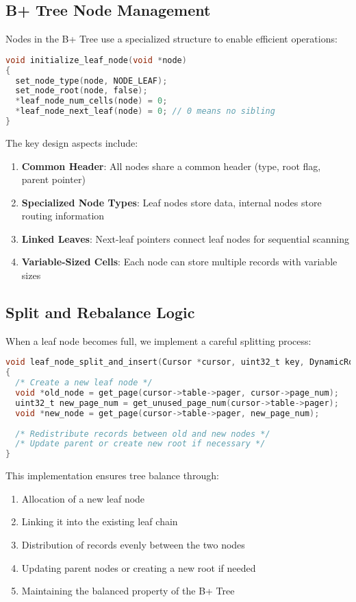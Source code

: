 \documentclass[12pt,a4paper]{article}  %
\begin{document}
\subsection{B+ Tree Node Management}

Nodes in the B+ Tree use a specialized structure to enable efficient operations:

\begin{lstlisting}[language=C]
void initialize_leaf_node(void *node)
{
  set_node_type(node, NODE_LEAF);
  set_node_root(node, false);
  *leaf_node_num_cells(node) = 0;
  *leaf_node_next_leaf(node) = 0; // 0 means no sibling
}
\end{lstlisting}

The key design aspects include:
\begin{enumerate}
    \item \textbf{Common Header}: All nodes share a common header (type, root flag, parent pointer)
    \item \textbf{Specialized Node Types}: Leaf nodes store data, internal nodes store routing information
    \item \textbf{Linked Leaves}: Next-leaf pointers connect leaf nodes for sequential scanning
    \item \textbf{Variable-Sized Cells}: Each node can store multiple records with variable sizes
\end{enumerate}

\subsection{Split and Rebalance Logic}

When a leaf node becomes full, we implement a careful splitting process:

\begin{lstlisting}[language=C]
void leaf_node_split_and_insert(Cursor *cursor, uint32_t key, DynamicRow *row, TableDef *table_def)
{
  /* Create a new leaf node */
  void *old_node = get_page(cursor->table->pager, cursor->page_num);
  uint32_t new_page_num = get_unused_page_num(cursor->table->pager);
  void *new_node = get_page(cursor->table->pager, new_page_num);
  
  /* Redistribute records between old and new nodes */
  /* Update parent or create new root if necessary */
}
\end{lstlisting}

This implementation ensures tree balance through:
\begin{enumerate}
    \item Allocation of a new leaf node
    \item Linking it into the existing leaf chain
    \item Distribution of records evenly between the two nodes
    \item Updating parent nodes or creating a new root if needed
    \item Maintaining the balanced property of the B+ Tree
\end{enumerate}
\end{document}
